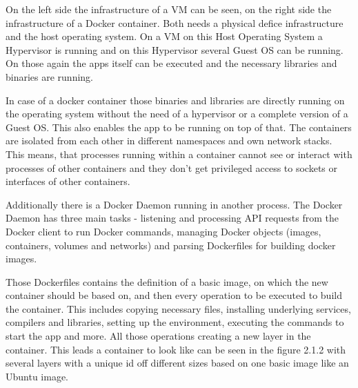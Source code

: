 On the left side the infrastructure of a VM can be seen, on the right side the infrastructure of a Docker container. Both needs a physical defice infrastructure and the host operating system. On a VM on this Host Operating System a Hypervisor is running and on this Hypervisor several Guest OS can be running. On those again the apps itself can be executed and the necessary libraries and binaries are running.

In case of a docker container those binaries and libraries are directly running on the operating system without the need of a hypervisor or a complete version of a Guest OS. This also enables the app to be running on top of that. The containers are isolated from each other in different namespaces and own network stacks. This means, that processes running within a container cannot see or interact with processes of other containers and they don't get privileged access to sockets or interfaces of other containers.


Additionally there is a Docker Daemon running in another process. The Docker Daemon has three main tasks - listening and processing API requests from the Docker client to run Docker commands, managing Docker objects (images, containers, volumes and networks) and parsing Dockerfiles for building docker images.


Those Dockerfiles contains the definition of a basic image, on which the new container should be based on, and then every operation to be executed to build the container. This includes copying necessary files, installing underlying services, compilers and libraries, setting up the environment, executing the commands to start the app and more. All those operations creating a new layer in the container. This leads a container to look like can be seen in the figure 2.1.2 with several layers with a unique id off different sizes based on one basic image like an Ubuntu image.

